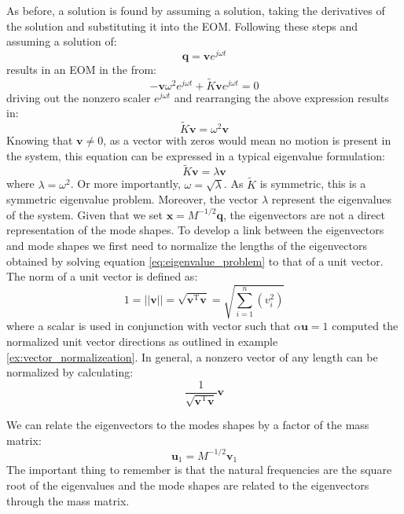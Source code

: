 \documentclass[12pt,letter]{article}
\numberwithin{ex}{section} %
\numberwithin{re}{section} %
\begin{document}
As before, a solution is found by assuming a solution, taking the derivatives of the solution and substituting it into the EOM. Following these steps and assuming a solution of:
\begin{equation}
\mathbf{q} = \textbf{v}e^{j\omega t}
\end{equation}
results in an EOM in the from:
\begin{equation}
-\textbf{v} \omega^2 e^{j\omega t} + \widetilde{K}\textbf{v}e^{j\omega t} =0
\end{equation}
driving out the nonzero scaler $e^{j\omega t}$ and rearranging the above expression results in:
\begin{equation}
\widetilde{K}\textbf{v} =  \omega^2 \textbf{v}
\end{equation}
Knowing that $\textbf{v}\neq0$, as a vector with zeros would mean no motion is present in the system, this equation can be expressed in a typical eigenvalue formulation:
\begin{equation}
\widetilde{K}\textbf{v} =  \lambda \textbf{v}
\label{eq:eigenvalue_problem}
\end{equation}
where $\lambda = \omega^2 $. Or more importantly, $\omega = \sqrt{\lambda}$. As $\widetilde{K}$ is symmetric, this is a symmetric eigenvalue problem. Moreover, the vector $\lambda$ represent the eigenvalues of the system. Given that  we set $\mathbf{x}=M^{-1/2}\mathbf{q}$, the eigenvectors are not a direct representation of the mode shapes. To develop a link between the eigenvectors and mode shapes we first need to normalize the lengths of the eigenvectors obtained by solving equation \ref{eq:eigenvalue_problem} to that of a unit vector. The norm of a unit vector is defined as:
\begin{equation}
1= ||\textbf{v}|| = \sqrt{\textbf{v}^{\text{T}}\textbf{v}} = \sqrt{\sum_{i=1}^{n}(v_i^2)}
\end{equation} 
where a scalar is used in conjunction with vector such that $\alpha\textbf{u}=1$ computed the normalized unit vector directions as outlined in example \ref{ex:vector_normalizeation}. In general, a nonzero vector of any length can be normalized by calculating:
\begin{equation}
\frac{1}{\sqrt{\textbf{v}^{\text{T}}\textbf{v}} } \textbf{v}
\end{equation} 


We can relate the eigenvectors to the modes shapes by a factor of the mass matrix:
\begin{equation}
\textbf{u}_1 = M^{-1/2}\textbf{v}_1
\label{eq:modeshape_to_eigenvector}
\end{equation}
The important thing to remember is that the natural frequencies are the square root of the eigenvalues and the mode shapes are related to the eigenvectors through the mass matrix. 
\end{document}
